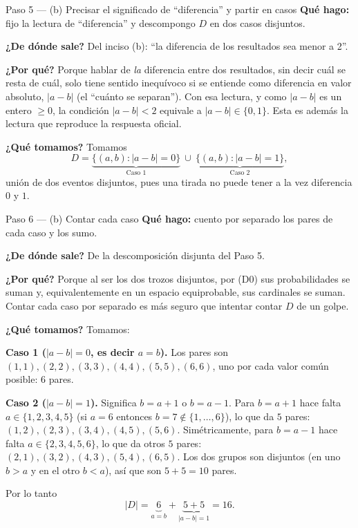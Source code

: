 \documentclass[11pt]{article}
\begin{document}
\begin{sol}
\begin{paso}{Paso 5 --- (b) Precisar el significado de ``diferencia'' y partir en casos}
\textbf{Qué hago:} fijo la lectura de ``diferencia'' y descompongo $D$ en dos casos disjuntos.

\textbf{¿De dónde sale?} Del inciso (b): ``la diferencia de los resultados sea menor a 2''.

\textbf{¿Por qué?} Porque hablar de \emph{la} diferencia entre dos resultados, sin decir cuál se
resta de cuál, solo tiene sentido inequívoco si se entiende como diferencia en valor absoluto,
$|a-b|$ (el ``cuánto se separan''). Con esa lectura, y como $|a-b|$ es un entero $\ge 0$, la
condición $|a-b|<2$ equivale a $|a-b|\in\{0,1\}$. Esta es además la lectura que reproduce la
respuesta oficial.

\textbf{¿Qué tomamos?} Tomamos
\[
D=\underbrace{\{(a,b): |a-b|=0\}}_{\text{Caso 1}}\ \cup\ \underbrace{\{(a,b): |a-b|=1\}}_{\text{Caso 2}},
\]
unión de dos eventos disjuntos, pues una tirada no puede tener a la vez diferencia $0$ y $1$.
\end{paso}

\begin{paso}{Paso 6 --- (b) Contar cada caso}
\textbf{Qué hago:} cuento por separado los pares de cada caso y los sumo.

\textbf{¿De dónde sale?} De la descomposición disjunta del Paso 5.

\textbf{¿Por qué?} Porque al ser los dos trozos disjuntos, por (D0) sus probabilidades se suman
y, equivalentemente en un espacio equiprobable, sus cardinales se suman. Contar cada caso por
separado es más seguro que intentar contar $D$ de un golpe.

\textbf{¿Qué tomamos?} Tomamos:

\medskip
\textbf{Caso 1 ($|a-b|=0$, es decir $a=b$).} Los pares son
$(1,1),(2,2),(3,3),(4,4),(5,5),(6,6)$, uno por cada valor común posible: $6$ pares.

\medskip
\textbf{Caso 2 ($|a-b|=1$).} Significa $b=a+1$ o $b=a-1$. Para $b=a+1$ hace falta
$a\in\{1,2,3,4,5\}$ (si $a=6$ entonces $b=7\notin\{1,\dots,6\}$), lo que da $5$ pares:
$(1,2),(2,3),(3,4),(4,5),(5,6)$. Simétricamente, para $b=a-1$ hace falta $a\in\{2,3,4,5,6\}$, lo
que da otros $5$ pares: $(2,1),(3,2),(4,3),(5,4),(6,5)$. Los dos grupos son disjuntos (en uno
$b>a$ y en el otro $b<a$), así que son $5+5=10$ pares.

\medskip
Por lo tanto
\[
|D|=\underbrace{6}_{a=b}+\underbrace{5+5}_{|a-b|=1}=16 .
\]
\end{paso}


\end{sol}
\end{document}
